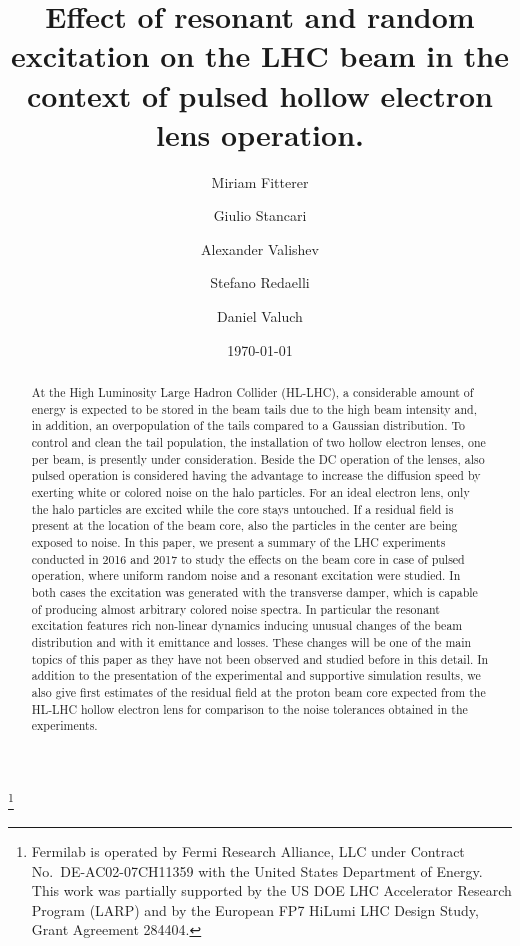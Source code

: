 \documentclass[%
 reprint,
 amsmath,amssymb,
 aps,
prstab,
]{revtex4-1}
\begin{document}
\title{Effect of resonant and random excitation on the LHC beam in the context of pulsed hollow electron lens operation.}%
\thanks{Fermilab is operated by Fermi Research Alliance, LLC under
	Contract No.~DE-AC02-07CH11359 with the United States Department of
	Energy. This work was partially supported by the US DOE LHC
	Accelerator Research Program (LARP) and by the European FP7 HiLumi
	LHC Design Study, Grant Agreement 284404.}

\author{Miriam Fitterer}
\author{Giulio Stancari}%
\author{Alexander Valishev}%
%

\author{Stefano Redaelli}
\author{Daniel Valuch}
%

\date{\today}%

\begin{abstract}
At the High Luminosity Large Hadron Collider (HL-LHC), a considerable amount of energy is expected to be stored in the beam tails due to the high beam intensity and, in addition, an overpopulation of the tails compared to a Gaussian distribution. To control and clean the tail population, the installation of two hollow electron lenses, one per beam, is presently under consideration. Beside the DC operation of the lenses, also pulsed operation is considered having the advantage to increase the diffusion speed by exerting white or colored noise on the halo particles. For an ideal electron lens, only the halo particles are excited while the core stays untouched. If a residual field is present at the location of the beam core, also the particles in the center are being exposed to noise. In this paper, we present 
a summary of the LHC experiments conducted in 2016 and 2017 to study the effects on the beam core in case of pulsed operation, where uniform random noise and a resonant excitation were studied. In both cases the excitation was generated with the transverse damper, which is capable of producing almost arbitrary colored noise spectra. In particular the resonant excitation features rich non-linear dynamics inducing unusual changes of the beam distribution and with it emittance and losses. These changes will be one of the main topics of this paper as they have not been observed and studied before in this detail. In addition to the presentation of the experimental and supportive simulation results, we also give first estimates of the residual field at the proton beam core expected from the HL-LHC hollow electron lens for comparison to the noise tolerances obtained in the experiments.
\end{abstract}
\end{document}
